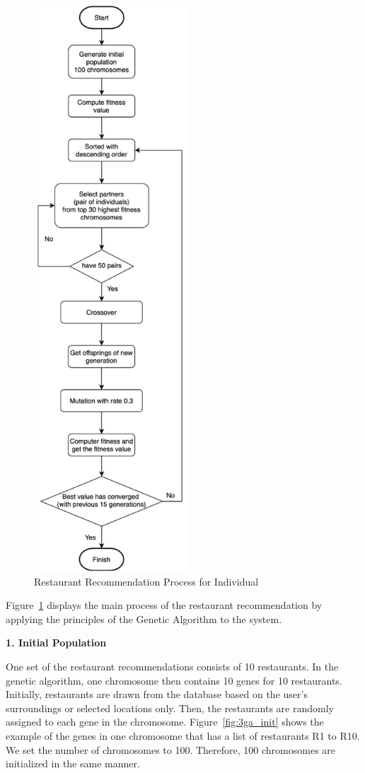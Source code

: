 \documentclass[12pt,oneside,openright,a4paper]{cpe-english-project}
\begin{document}
\begin{figure}[H]\centering
\includegraphics[height=600pt]{./images/3GeneticAlgorithmFlowchart.png}
\caption{Restaurant Recommendation Process for Individual}\label{fig:3GeneticAlgorithmFlowchart}
\end{figure}\vspace{-24pt}

Figure~\ref{fig:3GeneticAlgorithmFlowchart} displays the main process of the restaurant recommendation by applying the principles of the Genetic Algorithm to the system.

\textbf{1. Initial Population}\par

One set of the restaurant recommendations consists of 10 restaurants. In the genetic algorithm, one chromosome then contains 10 genes for 10 restaurants.  Initially, restaurants are drawn from the database based on the user's surroundings or selected locations only. Then, the restaurants are randomly assigned to each gene in the chromosome. Figure~\ref{fig:3ga_init} shows the example of the genes in one chromosome that has a list of restaurants R1 to R10. We set the number of chromosomes to 100. Therefore, 100 chromosomes are initialized in the same manner.
\end{document}
